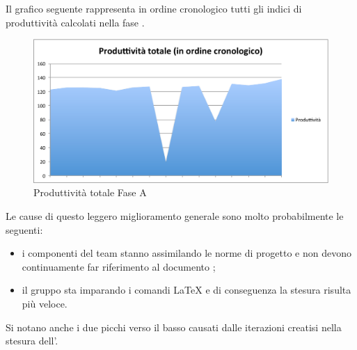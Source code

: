 						Il grafico seguente rappresenta in ordine cronologico tutti gli indici di produttività calcolati nella fase .
						\begin{figure}[H]\centering
							\includegraphics[width=12cm]{PianoDiQualifica/Pics/ProduttivitaTotaleFaseA.pdf}
							\caption{Produttività totale Fase A}
						\end{figure}
						Le cause di questo leggero miglioramento generale sono molto probabilmente le seguenti:
						\begin{itemize}
							\item i componenti del team stanno assimilando le norme di progetto e non devono continuamente far riferimento al documento ;
							\item il gruppo sta imparando i comandi \LaTeX{} e di conseguenza la stesura risulta più veloce.
						\end{itemize}						
						Si notano anche i due picchi verso il basso causati dalle iterazioni creatisi nella stesura dell'.
						
